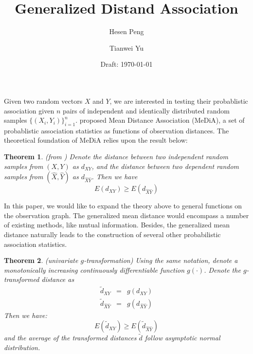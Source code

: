 \documentclass[12pt,letterpaper]{article}
\newtheorem{thm}{Theorem}
\begin{document}


\title{Generalized Distand Association} 
\author{Hesen Peng \and Tianwei Yu}
\date{Draft: \today{}} 
\maketitle{}

Given two random vectors $X$ and $Y$, we are interested in testing
their probablistic association given $n$ pairs of independent and
identically distributed random samples $\{(X_i, Y_i)\}_{i=1}^n$.
\cite{cite:10.1371/journal.pone.0124620} proposed Mean Distance
Association (MeDiA), a set of probablistic association statistics as
functions of observation distances. The theoretical foundation of
MeDiA relies upon the result below: 

\begin{thm}
  \label{thm:1} 
  (from \cite{cite:10.1371/journal.pone.0124620}) Denote the distance
  between two independent random samples from $(X,Y)$ as $d_{XY}$, and
  the distance between two dependent random samples from
  $(\hat{X},\hat{Y})$ as $d_{\hat{X}\hat{Y}}$. Then we have
  \begin{displaymath}
    E(d_{XY}) \ge E(d_{\hat{X}\hat{Y}})
  \end{displaymath}
\end{thm}

In this paper, we would like to expand the theory above to general
functions on the observation graph. The generalized mean distance
would encompass a number of existing methods, like mutual
information. Besides, the generalized mean distance naturally leads to
the construction of several other probabilistic association
statistics.

\begin{thm}
  \label{thm:2}
  (univariate $g$-transformation) Using the same notation, denote a
  monotonically increasing continuously differentiable function
  $g(\cdot)$. Denote the $g$-transformed distance as
  \begin{eqnarray*}
    \tilde{d}_{XY} &=& g(d_{XY})\\
    \tilde{d}_{\hat{X}\hat{Y}} &=& g(d_{\hat{X}\hat{Y}})
  \end{eqnarray*}
  Then we have:
  \begin{displaymath}
    E(\tilde{d}_{XY}) \ge E(\tilde{d}_{\hat{X}\hat{Y}})
  \end{displaymath}
  and the average of the transformed distances $\tilde{d}$ follow
  asymptotic normal distribution.
\end{thm}
\end{document}
